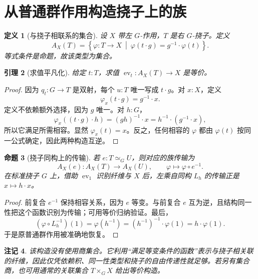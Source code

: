 \documentclass[12pt,oneside,openany,fontset=none]{ctexbook}
\theoremstyle{cn}
\newtheorem{definition}{定义}[chapter]
\newtheorem{lemma}[definition]{引理}
\newtheorem{proposition}[definition]{命题}
\newtheorem{remark}[definition]{注记}
\numberwithin{equation}{chapter}
\newcommand{\ev}{\operatorname{ev}}
\begin{document}
\section{从普通群作用构造挠子上的族}
\begin{definition}[与挠子相联系的集合]
设 $X$ 带左 $G$-作用，$T$ 是右 $G$-挠子。定义
\[
A_X(T)=\left\{\varphi:T\to X\ \middle|\ 
\varphi(t\cdot g)=g^{-1}\cdot\varphi(t)\right\}.
\]
等式条件是命题，故该类型为集合。
\end{definition}
\begin{lemma}[求值平凡化]
给定 $t:T$，求值 $\ev_t:A_X(T)\to X$ 是等价。
\end{lemma}
\begin{proof}
因为 $q_t:G\to T$ 是双射，每个 $u:T$ 唯一写成 $t\cdot g$。对 $x:X$，定义
\[
\varphi_x(t\cdot g)=g^{-1}\cdot x.
\]
定义不依赖额外选择，因为 $g$ 唯一。对 $h:G$，
\[
\varphi_x((t\cdot g)\cdot h)
=(gh)^{-1}\cdot x
=h^{-1}\cdot(g^{-1}\cdot x),
\]
所以它满足所需相容。显然 $\varphi_x(t)=x$。反之，任何相容的 $\varphi$ 都由 $\varphi(t)$ 按同一公式确定，因此两种构造互逆。
\end{proof}
\begin{proposition}[挠子同构上的传输]
若 $e:T\simeq_G U$，则对应的族传输为
\[
A_X(e):A_X(T)\to A_X(U),
\qquad \varphi\longmapsto\varphi\circ e^{-1}.
\]
在标准挠子 $G$ 上，借助 $\ev_1$ 识别纤维与 $X$ 后，左乘自同构 $L_h$ 的传输正是 $x\mapsto h\cdot x$。
\end{proposition}
\begin{proof}
前复合 $e^{-1}$ 保持相容关系，因为 $e$ 等变。与前复合 $e$ 互为逆，且结构同一性把这个函数识别为传输；可用等价归纳验证。最后，
\[
(\varphi\circ L_h^{-1})(1)=\varphi(h^{-1})
=(h^{-1})^{-1}\cdot\varphi(1)=h\cdot\varphi(1).
\]
于是原普通群作用被准确地恢复。
\end{proof}
\begin{remark}
该构造没有使用商集合。它利用“满足等变条件的函数”表示与挠子相关联的纤维，因此仅凭依赖积、同一性类型和挠子的自由传递性就足够。若另有集合商，也可用通常的关联集合 $T\times_G X$ 给出等价构造。
\end{remark}
\end{document}
